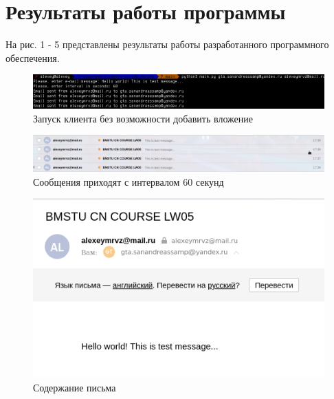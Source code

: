 \documentclass[12pt]{report}
\begin{document}
\section*{Результаты работы программы}

На рис. 1 - 5 представлены результаты работы разработанного программного обеспечения.

\begin{figure}[H]
	\begin{center}
		\includegraphics[scale=0.53]{img/1.png}
	\end{center}
	\caption{Запуск клиента без возможности добавить вложение}
	\label{fig:example-no-attachment}
\end{figure}

\begin{figure}[H]
	\begin{center}
		\includegraphics[scale=0.43]{img/2.png}
	\end{center}
	\caption{Сообщения приходят с интервалом 60 секунд}
	\label{fig:example-no-attachment-mail-1}
\end{figure}

\begin{figure}[H]
	\begin{center}
		\includegraphics[scale=0.65]{img/3.png}
	\end{center}
	\caption{Содержание письма}
	\label{fig:example-no-attachment-mail-2}
\end{figure}
\end{document}
